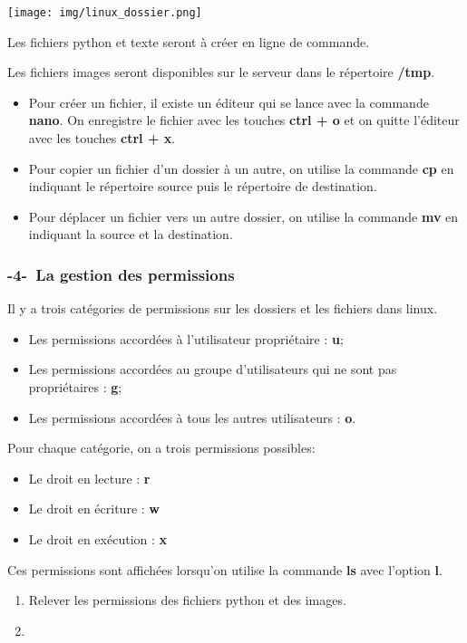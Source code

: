\documentclass[11pt,a4paper]{article}
\begin{document}
\begin{enumerate}
\begin{center}
\texttt{[image: img/linux\_dossier.png]}
\end{center}

Les fichiers python et texte seront à créer en ligne de commande.

Les fichiers images seront disponibles sur le serveur dans le répertoire \textbf{/tmp}.

\begin{itemize}
\item Pour créer un fichier, il existe un éditeur qui se lance avec la commande \textbf{nano}. On enregistre le fichier avec les touches \textbf{ctrl + o} et on quitte l'éditeur avec les touches \textbf{ctrl + x}.

\item Pour copier un fichier d'un dossier à un autre, on utilise la commande \textbf{cp} en indiquant le répertoire source puis le répertoire de destination.

\item Pour déplacer un fichier vers un autre dossier, on utilise la commande \textbf{mv}  en indiquant la source et la destination.
\end{itemize}


\end{enumerate}

\subsubsection*{-4-~La gestion des permissions}

Il y a trois catégories de permissions sur les dossiers et les fichiers dans linux.
\begin{itemize}
\item Les permissions accordées à l'utilisateur propriétaire : \textbf{u};
\item Les permissions accordées au groupe d'utilisateurs qui ne sont pas propriétaires : \textbf{g};
\item Les permissions accordées à tous les autres utilisateurs : \textbf{o}.
\end{itemize}

Pour chaque catégorie, on a trois permissions possibles:
\begin{itemize}
\item Le droit en lecture : \textbf{r}
\item Le droit en écriture : \textbf{w}
\item Le droit en exécution : \textbf{x}
\end{itemize}

Ces permissions sont affichées lorsqu'on utilise la commande \textbf{ls} avec l'option \textbf{l}.

\begin{enumerate}
\item Relever les permissions des fichiers python et des images.
\item 
\end{enumerate}
\end{document}
